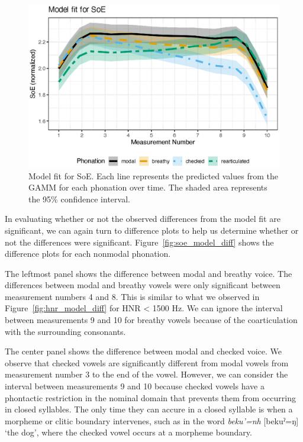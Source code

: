 \begin{figure}[h!]
    \centering
    \includegraphics[width = \linewidth]{images/LCH_GAMMs/soe_model_fit.eps}
    \caption{Model fit for SoE. Each line represents the predicted values from the GAMM for each phonation over time. The shaded area represents the 95\% confidence interval.}
    \label{fig:soe_model_fit}
\end{figure}

In evaluating whether or not the observed differences from the model fit are significant, we can again turn to difference plots to help us determine whether or not the differences were significant. Figure~\ref{fig:soe_model_diff} shows the difference plots for each nonmodal phonation. 

The leftmost panel shows the difference between modal and breathy voice. The differences between modal and breathy vowels were only significant between measurement numbers 4 and 8. This is similar to what we observed in Figure~\ref{fig:hnr_model_diff} for HNR < 1500 Hz. We can ignore the interval between measurements 9 and 10 for breathy vowels because of the coarticulation with the surrounding consonants.

The center panel shows the difference between modal and checked voice. We observe that checked vowels are significantly different from modal vowels from measurement number 3 to the end of the vowel. However, we can consider the interval between measurements 9 and 10 because checked vowels have a phontactic restriction in the nominal domain that prevents them from occurring in closed syllables. The only time they can accure in a closed syllable is when a morpheme or clitic boundary intervenes, such as in the word \textit{beku'=nh} [bekuˀ=ŋ] `the dog', where the checked vowel occurs at a morpheme boundary. 


